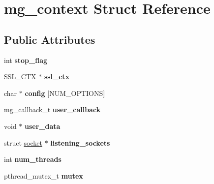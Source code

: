 \hypertarget{structmg__context}{\section{mg\-\_\-context Struct Reference}
\label{structmg__context}
}
\subsection*{Public Attributes}
\begin{DoxyCompactItemize}
\item 
\hypertarget{structmg__context_a49996b52099257da8c06e5ccecd478fb}{int {\bfseries stop\-\_\-flag}}\label{structmg__context_a49996b52099257da8c06e5ccecd478fb}

\item 
\hypertarget{structmg__context_a463677406a1b4dd5e5a6a9df427800ce}{S\-S\-L\-\_\-\-C\-T\-X $\ast$ {\bfseries ssl\-\_\-ctx}}\label{structmg__context_a463677406a1b4dd5e5a6a9df427800ce}

\item 
\hypertarget{structmg__context_adf904c7ddd0214498d77f9ba70262dce}{char $\ast$ {\bfseries config} \mbox{[}N\-U\-M\-\_\-\-O\-P\-T\-I\-O\-N\-S\mbox{]}}\label{structmg__context_adf904c7ddd0214498d77f9ba70262dce}

\item 
\hypertarget{structmg__context_a3b5cc8977ca3af5ff20c3b445c0a9823}{mg\-\_\-callback\-\_\-t {\bfseries user\-\_\-callback}}\label{structmg__context_a3b5cc8977ca3af5ff20c3b445c0a9823}

\item 
\hypertarget{structmg__context_a73a26dd1c9abead88b40b2d226ad9f28}{void $\ast$ {\bfseries user\-\_\-data}}\label{structmg__context_a73a26dd1c9abead88b40b2d226ad9f28}

\item 
\hypertarget{structmg__context_a8639456185dda0c46dc6131f814a9d3f}{struct \hyperlink{structsocket}{socket} $\ast$ {\bfseries listening\-\_\-sockets}}\label{structmg__context_a8639456185dda0c46dc6131f814a9d3f}

\item 
\hypertarget{structmg__context_a85cc21ebe888a9c10a87e135d242cf43}{int {\bfseries num\-\_\-threads}}\label{structmg__context_a85cc21ebe888a9c10a87e135d242cf43}

\item 
\hypertarget{structmg__context_ae4d63e22f24744ca80804d96c2936dc1}{pthread\-\_\-mutex\-\_\-t {\bfseries mutex}}\label{structmg__context_ae4d63e22f24744ca80804d96c2936dc1}


\end{DoxyCompactItemize}
